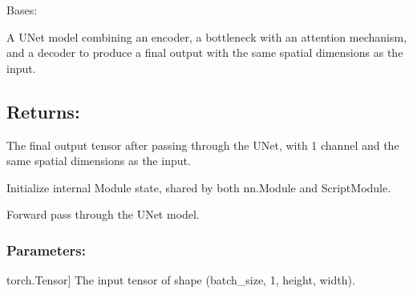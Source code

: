 \documentclass[a4paper,10pt,english]{sphinxmanual}
\begin{document}
\begin{fulllineitems}
\begin{fulllineitems}
\begin{description}
\end{description}

\end{fulllineitems}


\end{fulllineitems}


\begin{fulllineitems}
\label{\detokenize{models:fireDiff.Models.unet.UNet}}
\pysigstartsignatures
{}
\pysigstopsignatures
\sphinxAtStartPar
Bases: 

\sphinxAtStartPar
A U\sphinxhyphen{}Net model combining an encoder, a bottleneck with an attention
mechanism, and a decoder to produce a final output with the same
spatial dimensions as the input.


\subsection{Returns:}
\label{\detokenize{models:id13}}\begin{description}
\sphinxAtStartPar
The final output tensor after passing through the U\sphinxhyphen{}Net, with
1 channel and the same spatial dimensions as the input.

\end{description}

\sphinxAtStartPar
Initialize internal Module state, shared by both nn.Module and ScriptModule.

\begin{fulllineitems}
\label{\detokenize{models:fireDiff.Models.unet.UNet.forward}}
\pysigstartsignatures
{}
\pysigstopsignatures
\sphinxAtStartPar
Forward pass through the U\sphinxhyphen{}Net model.


\subsubsection{Parameters:}
\label{\detokenize{models:id14}}\begin{description}
\sphinxlineitem{x}{[}torch.Tensor{]}
\sphinxAtStartPar
The input tensor of shape (batch\_size, 1, height, width).


\end{description}
\end{fulllineitems}
\end{fulllineitems}
\end{document}
